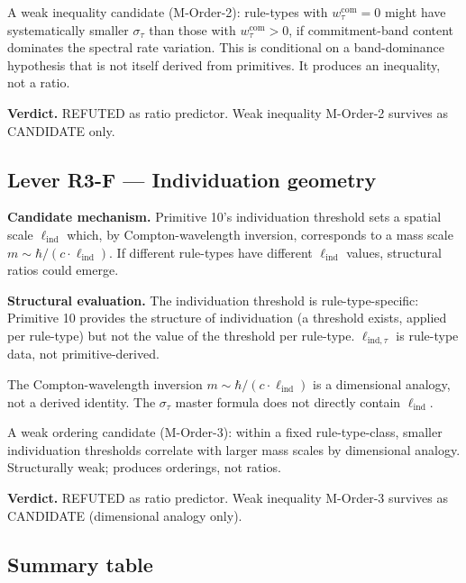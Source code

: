 \documentclass[11pt,a4paper]{article}
\begin{document}
A weak inequality candidate (M-Order-2): rule-types with $w_\tau^{\mathrm{com}} = 0$ might have systematically smaller $\sigma_\tau$ than those with $w_\tau^{\mathrm{com}} > 0$, if commitment-band content dominates the spectral rate variation. This is conditional on a band-dominance hypothesis that is not itself derived from primitives. It produces an inequality, not a ratio.

\textbf{Verdict.} REFUTED as ratio predictor. Weak inequality M-Order-2 survives as CANDIDATE only.

\subsection{Lever R3-F --- Individuation geometry}

\textbf{Candidate mechanism.} Primitive 10's individuation threshold sets a spatial scale $\ell_{\mathrm{ind}}$ which, by Compton-wavelength inversion, corresponds to a mass scale $m \sim \hbar/(c\cdot\ell_{\mathrm{ind}})$. If different rule-types have different $\ell_{\mathrm{ind}}$ values, structural ratios could emerge.

\textbf{Structural evaluation.} The individuation threshold is rule-type-specific: Primitive 10 provides the structure of individuation (a threshold exists, applied per rule-type) but not the value of the threshold per rule-type. $\ell_{\mathrm{ind},\tau}$ is rule-type data, not primitive-derived.

The Compton-wavelength inversion $m \sim \hbar/(c\cdot\ell_{\mathrm{ind}})$ is a dimensional analogy, not a derived identity. The $\sigma_\tau$ master formula does not directly contain $\ell_{\mathrm{ind}}$.

A weak ordering candidate (M-Order-3): within a fixed rule-type-class, smaller individuation thresholds correlate with larger mass scales by dimensional analogy. Structurally weak; produces orderings, not ratios.

\textbf{Verdict.} REFUTED as ratio predictor. Weak inequality M-Order-3 survives as CANDIDATE (dimensional analogy only).

\subsection{Summary table}
\end{document}
